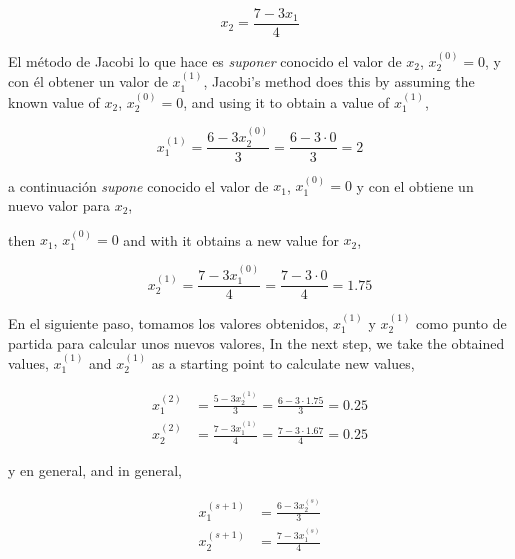 \begin{equation*}
x_2=\frac{7-3x_1}{4}
\end{equation*}

\begin{paracol}{2}
El método de Jacobi lo que hace es \emph{suponer} conocido el valor de $x_2$, $x_2^{(0)}=0$, y con él obtener un valor de $x_1^{(1)}$,
\switchcolumn
Jacobi's method does this by assuming the known value of $x_2$, $x_2^{(0)}=0$, and using it to obtain a value of $x_1^{(1)}$,
\end{paracol}

\begin{equation*}
x_1^{(1)}=\frac{6-3x_2^{(0)}}{3}=\frac{6-3\cdot 0}{3}=2
\end{equation*}

\begin{paracol}{2}

a continuación \emph{supone} conocido el valor de $x_1$, $x_1^{(0)}=0$ y con el obtiene un nuevo valor para $x_2$,

    \switchcolumn
then $x_1$, $x_1^{(0)}=0$ and with it obtains a new value for $x_2$,
\end{paracol}

\begin{equation*}
x_2^{(1)}=\frac{7-3x_1^{(0)}}{4}=\frac{7-3\cdot 0}{4}=1.75
\end{equation*}

\begin{paracol}{2}
En el siguiente paso, tomamos los valores obtenidos, $x_1^{(1)}$ y $x_2^{(1)}$ como punto de partida para calcular unos nuevos valores,
\switchcolumn
In the next step, we take the obtained values, $x_1^{(1)}$ and $x_2^{(1)}$ as a starting point to calculate new values,
\end{paracol}

\begin{align*}
x_1^{(2)}&=\frac{5-3x_2^{(1)}}{3}=\frac{6-3\cdot 1.75}{3}=0.25\\
x_2^{(2)}&=\frac{7-3x_1^{(1)}}{4}=\frac{7-3\cdot 1.67}{4}=0.25
\end{align*}

\begin{paracol}{2}
y en general,
\switchcolumn
and in general,
\end{paracol}

\begin{align*}
x_1^{(s+1)}&=\frac{6-3x_2^{(s)}}{3}\\
x_2^{(s+1)}&=\frac{7-3x_1^{(s)}}{4}
\end{align*}


